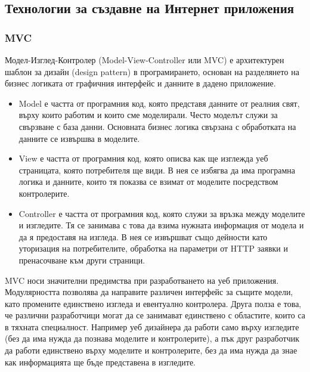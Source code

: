 \documentclass[pdftex,14pt,a4paper]{extreport}
\begin{document}
\subsection {Технологии за създавне на Интернет приложения}
\subsubsection {MVC}
Модел-Изглед-Контролер (Model-View-Controller или MVC) е архитектурен шаблон за дизайн (design pattern) в програмирането, основан на разделянето на бизнес логиката от графичния интерфейс и данните в дадено приложение.
\begin{itemize}
  \item Model е частта от програмния код, която представя данните от реалния свят, върху които работим и които сме моделирали. Често моделът служи за свързване с база данни. Основната бизнес логика свързана с обработката на данните се извършва в моделите.
  \item View е частта от програмния код, която описва как ще изглежда уеб страницата, която потребителя ще види. В нея се избягва да има програмна логика и данните, които тя показва се взимат от моделите посредством контролерите.
  \item Controller е частта от програмния код, която служи за връзка между моделите и изгледите. Тя се занимава с това да взима нужната информация от модела и да я предоставя на изгледа. В нея се извършват също дейности като уторизация на потребителите, обработка на параметри от HTTP заявки и пренасочване към други страници.
\end{itemize}
MVC носи значителни предимства при разработването на уеб приложения. Модулярността позволява да направите различен интерфейс за същите модели, като промените единствено изгледа и евентуално контролера. Друга полза е това, че различни разработчици могат да се занимават единствено с областите, които са в тяхната специалност. Например уеб дизайнера да работи само върху изгледите (без да има нужда да познава моделите и контролерите), а пък друг разработчик да работи единствено върху моделите и контролерите, без да има нужда да знае как информацията ще бъде представена в изгледите.
\end{document}
